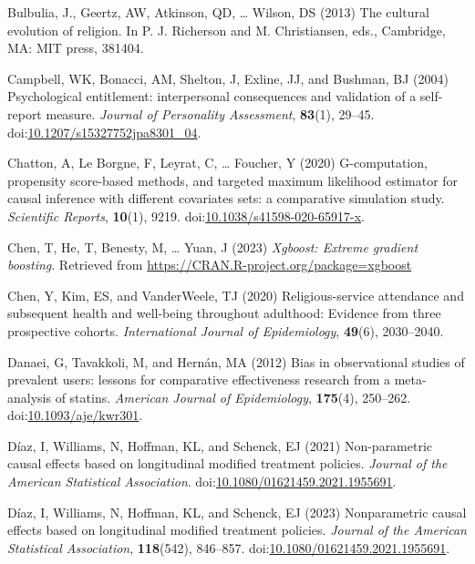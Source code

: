 \documentclass[
  single column]{article}
\newlength{\cslhangindent}
\newenvironment{CSLReferences}[2] %
 {\begin{list}{}{%
  \setlength{\itemindent}{0pt}
  \setlength{\leftmargin}{0pt}
  \setlength{\parsep}{0pt}
  \ifodd #1
   \setlength{\leftmargin}{\cslhangindent}
   \setlength{\itemindent}{-1\cslhangindent}
  \fi
  \setlength{\itemsep}{#2\baselineskip}}}
 {\end{list}}
\begin{document}
\begin{CSLReferences}{1}{0}
Bulbulia, J., Geertz, AW, Atkinson, QD, \ldots{} Wilson, DS (2013) The
cultural evolution of religion. In P. J. Richerson and M. Christiansen,
eds., Cambridge, MA: MIT press, 381404.

Campbell, WK, Bonacci, AM, Shelton, J, Exline, JJ, and Bushman, BJ
(2004) Psychological entitlement: interpersonal consequences and
validation of a self-report measure. \emph{Journal of Personality
Assessment}, \textbf{83}(1), 29--45.
doi:\href{https://doi.org/10.1207/s15327752jpa8301_04}{10.1207/s15327752jpa8301\_04}.

Chatton, A, Le Borgne, F, Leyrat, C, \ldots{} Foucher, Y (2020)
G-computation, propensity score-based methods, and targeted maximum
likelihood estimator for causal inference with different covariates
sets: a comparative simulation study. \emph{Scientific Reports},
\textbf{10}(1), 9219.
doi:\href{https://doi.org/10.1038/s41598-020-65917-x}{10.1038/s41598-020-65917-x}.

Chen, T, He, T, Benesty, M, \ldots{} Yuan, J (2023) \emph{Xgboost:
Extreme gradient boosting}. Retrieved from
\url{https://CRAN.R-project.org/package=xgboost}

Chen, Y, Kim, ES, and VanderWeele, TJ (2020) Religious-service
attendance and subsequent health and well-being throughout adulthood:
Evidence from three prospective cohorts. \emph{International Journal of
Epidemiology}, \textbf{49}(6), 2030--2040.

Danaei, G, Tavakkoli, M, and Hernán, MA (2012) Bias in observational
studies of prevalent users: lessons for comparative effectiveness
research from a meta-analysis of statins. \emph{American Journal of
Epidemiology}, \textbf{175}(4), 250--262.
doi:\href{https://doi.org/10.1093/aje/kwr301}{10.1093/aje/kwr301}.

Díaz, I, Williams, N, Hoffman, KL, and Schenck, EJ (2021) Non-parametric
causal effects based on longitudinal modified treatment policies.
\emph{Journal of the American Statistical Association}.
doi:\href{https://doi.org/10.1080/01621459.2021.1955691}{10.1080/01621459.2021.1955691}.

Díaz, I, Williams, N, Hoffman, KL, and Schenck, EJ (2023) Nonparametric
causal effects based on longitudinal modified treatment policies.
\emph{Journal of the American Statistical Association},
\textbf{118}(542), 846--857.
doi:\href{https://doi.org/10.1080/01621459.2021.1955691}{10.1080/01621459.2021.1955691}.


\end{CSLReferences}
\end{document}
